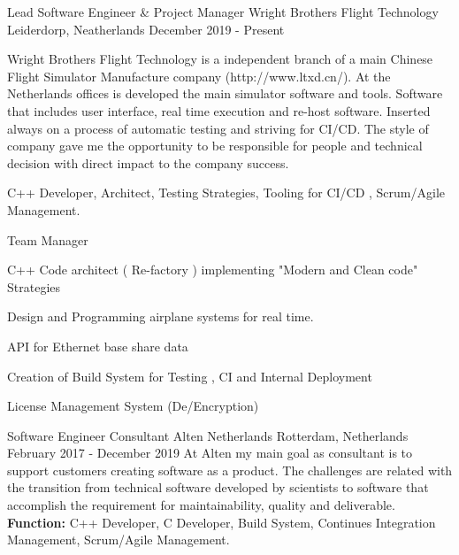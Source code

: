 \begin{cventries}
    \cventry
    {Lead Software Engineer \& Project Manager}
    {Wright Brothers Flight Technology}
    {Leiderdorp, Neatherlands}
    {December 2019 - Present}
    {    
     Wright Brothers Flight Technology is a independent branch of a main Chinese Flight Simulator Manufacture company (http://www.ltxd.cn/).\newline
     At the Netherlands offices is developed the main simulator software and tools. Software that includes user interface, real time execution and re-host software. Inserted always on a process of automatic testing and striving for CI/CD.\newline
     The style of company gave me the opportunity to be responsible for people and technical decision with direct impact to the company success.\newline
     \begin{cvparagraph}
      C++ Developer, Architect, Testing Strategies, Tooling for CI/CD ,
     Scrum/Agile Management.\newline 
     \end{cvparagraph}
     \begin{cvparagraph}
      \vspace{4mm}
        \begin{cvitems}
        \item Team Manager
        \item C++ Code architect ( Re-factory ) implementing "Modern and Clean code" Strategies 
        \item Design and Programming airplane systems for real time.
        \item API for Ethernet base share data
        \item Creation of Build System for Testing , CI and Internal Deployment
        \item License Management System (De/Encryption)
        \end{cvitems}
    \end{cvparagraph}
    }
  
  \cventry
    {Software Engineer Consultant}
    {Alten Netherlands}
    {Rotterdam, Netherlands}
    {February 2017 - December 2019}
    {          
    At Alten my main goal as consultant is to support customers creating software as a product. The challenges are related with the transition from technical software developed by scientists  to software that accomplish the requirement for maintainability, quality and deliverable. \textbf{Function:} C++ Developer, C Developer, Build System, Continues Integration Management, Scrum/Agile Management.
}
\end{cventries}
